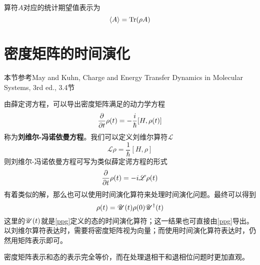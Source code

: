算符$ A $对应的统计期望值表示为
\begin{equation}\label{key}
\langle A\rangle=\textrm{Tr}(\rho A)
\end{equation}

\section{密度矩阵的时间演化}
\begin{framed}
	本节参考May and Kuhn, Charge and Energy Transfer Dynamics in Molecular Systems, 3rd ed., 3.4节
\end{framed}
由薛定谔方程，可以导出密度矩阵满足的动力学方程
\begin{equation}\label{key}
\dfrac{\partial}{\partial t}\rho(t)=-\dfrac{i}{\hbar}[H,\rho(t)]
\end{equation}
称为\textbf{刘维尔-冯诺依曼方程}。我们可以定义刘维尔算符$ \mathscr{L} $
\begin{equation}\label{key}
\mathscr{L}\rho=\dfrac{1}{\hbar}[H,\rho]
\end{equation}
则刘维尔-冯诺依曼方程可写为类似薛定谔方程的形式
\begin{equation}\label{key}
\dfrac{\partial}{\partial t}\rho(t)=-i\mathscr{L}\rho(t)
\end{equation}
有着类似的解，那么也可以使用时间演化算符来处理时间演化问题。最终可以得到
\begin{equation}\label{key}
\rho(t)=\mathscr{U}(t)\rho(0)\mathscr{U}^\dagger(t)
\end{equation}
这里的$ \mathscr{U}(t) $就是\eqref{ppg}定义的态的时间演化算符；这一结果也可直接由\eqref{ppg}导出。以刘维尔算符表达时，需要将密度矩阵视为向量；而使用时间演化算符表达时，仍然用矩阵表示即可。

密度矩阵表示和态的表示完全等价，而在处理退相干和退相位问题时更加直观。

